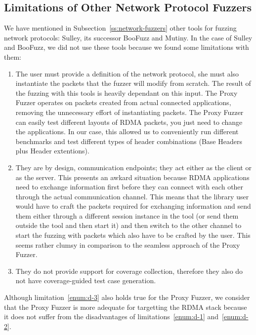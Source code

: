 \subsection{Limitations of Other Network Protocol Fuzzers}\label{ss:prob-nw-fuzzers}

We have mentioned in Subsection~\ref{ss:network-fuzzers} other tools for fuzzing network protocols: Sulley, its successor
BooFuzz and Mutiny. In the case of Sulley and
BooFuzz, we did not use these tools because we found some limitations with them:

\begin{enumerate}
   \item The user must provide a definition of the network protocol, she must also instantiate the packets that the fuzzer will modify from scratch. The result of the fuzzing with this tools is heavily dependant on this input. The Proxy Fuzzer operates on packets created from actual connected applications, removing the unnecessary effort of instantiating packets. The Proxy Fuzzer can easily test different layouts of RDMA packets, you just need to change the applications. In our case, this allowed us to conveniently run different benchmarks and test different types of header combinations (Base Headers plus Header extentions).\label{enum:d-1}
   \item They are by design, communication endpoints; they act either as the client or as the server. This presents an awkard situation because RDMA applications need to exchange information first before they can connect with each other through the actual communication channel. This means that the library user would have to craft the packets required for exchanging information and send them either through a different session instance in the tool (or send them outside the tool and then start it)  and then switch to the other channel to start the fuzzing with packets which also have to be crafted by the user. This seems rather clumsy in comparison to the seamless approach of the Proxy Fuzzer.\label{enum:d-2}
   \item They do not provide support for coverage collection, therefore they also do not have coverage-guided test case generation.\label{enum:d-3}
\end{enumerate}

Although limitation~\ref{enum:d-3} also holds true for the Proxy Fuzzer, we consider that the Proxy Fuzzer is more adequate for
targetting the RDMA stack because it does not suffer from the disadvantages of limitations~\ref{enum:d-1} and~\ref{enum:d-2}.

